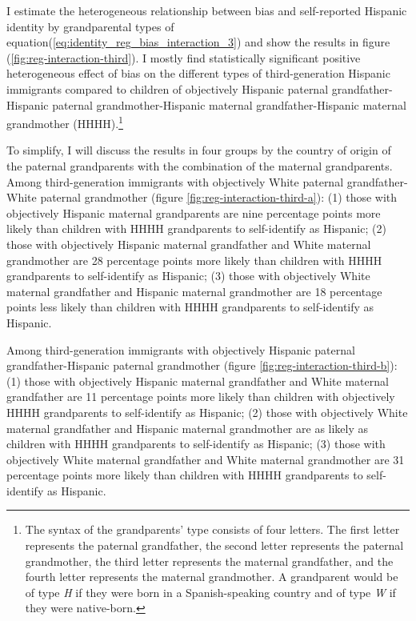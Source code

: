 \documentclass[12pt, fullpage]{article}
\begin{document}
I estimate the heterogeneous relationship between bias and self-reported Hispanic identity by grandparental types of equation(\ref{eq:identity_reg_bias_interaction_3}) and show the results in figure (\ref{fig:reg-interaction-third}). I mostly find statistically significant positive heterogeneous effect of bias on the different types of third-generation Hispanic immigrants compared to children of objectively Hispanic paternal grandfather-Hispanic paternal grandmother-Hispanic maternal grandfather-Hispanic maternal grandmother (HHHH).\footnote{The syntax of the grandparents' type consists of four letters. The first letter represents the paternal grandfather, the second letter represents the paternal grandmother, the third letter represents the maternal grandfather, and the fourth letter represents the maternal grandmother. A grandparent would be of type \textit{H} if they were born in a Spanish-speaking country and of type \textit{W} if they were native-born.} 

To simplify, I will discuss the results in four groups by the country of origin of the paternal grandparents with the combination of the maternal grandparents. Among third-generation immigrants with objectively White paternal grandfather-White paternal grandmother (figure \ref{fig:reg-interaction-third-a}): (1) those with objectively Hispanic maternal grandparents are nine percentage points more likely than children with HHHH grandparents to self-identify as Hispanic; (2) those with objectively Hispanic maternal grandfather and White maternal grandmother are 28 percentage points more likely than children with HHHH grandparents to self-identify as Hispanic; (3) those with objectively White maternal grandfather and Hispanic maternal grandmother are 18 percentage points less likely than children with HHHH grandparents to self-identify as Hispanic. 

Among third-generation immigrants with objectively Hispanic paternal grandfather-Hispanic paternal grandmother (figure \ref{fig:reg-interaction-third-b}): (1) those with objectively Hispanic maternal grandfather and White maternal grandfather are 11 percentage points more likely than children with objectively HHHH grandparents to self-identify as Hispanic; (2) those with objectively White maternal grandfather and Hispanic maternal grandmother are as likely as children with HHHH grandparents to self-identify as Hispanic; (3) those with objectively White maternal grandfather and White maternal grandmother are 31 percentage points more likely than children with HHHH grandparents to self-identify as Hispanic.
\end{document}
